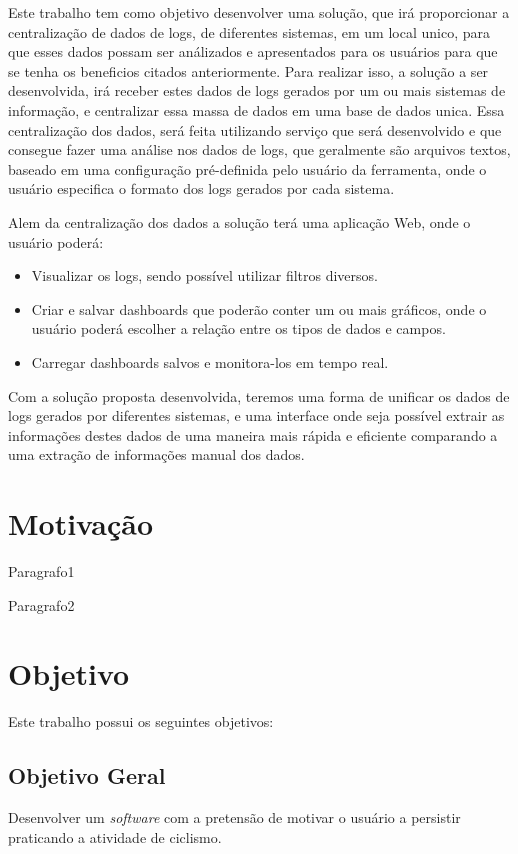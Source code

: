 Este trabalho tem como objetivo desenvolver uma solução, que irá proporcionar a centralização de dados de logs, de diferentes sistemas, em um local unico, para que esses dados possam ser análizados e apresentados para os usuários para que se tenha os beneficios citados anteriormente. Para realizar isso, a solução a ser desenvolvida, irá receber estes dados de logs gerados por um ou mais sistemas de informação, e centralizar essa massa de dados em uma base de dados unica. Essa centralização dos dados, será feita utilizando serviço que será desenvolvido e que consegue fazer uma análise nos dados de logs, que geralmente são arquivos textos, baseado em uma configuração pré-definida pelo usuário da ferramenta, onde o usuário especifica o formato dos logs gerados por cada sistema. \par

Alem da centralização dos dados a solução terá uma aplicação Web, onde o usuário poderá:
\begin{itemize}
\item Visualizar os logs, sendo possível utilizar filtros diversos.
\item Criar e salvar dashboards que poderão conter um ou mais gráficos, onde o usuário poderá escolher a relação entre os tipos de dados e campos.
\item Carregar dashboards salvos e monitora-los em tempo real.
\end{itemize}

Com a solução proposta desenvolvida, teremos uma forma de unificar os dados de logs gerados por diferentes sistemas, e uma interface onde seja possível extrair as informações destes dados de uma maneira mais rápida e eficiente comparando a uma extração de informações manual dos dados.

\section{Motivação}
Paragrafo1 \par

Paragrafo2

\section{Objetivo}
Este trabalho possui os seguintes objetivos:

\subsection{Objetivo Geral}
Desenvolver um \textit{software} com a pretensão de motivar o usuário a persistir praticando a atividade de ciclismo. 

